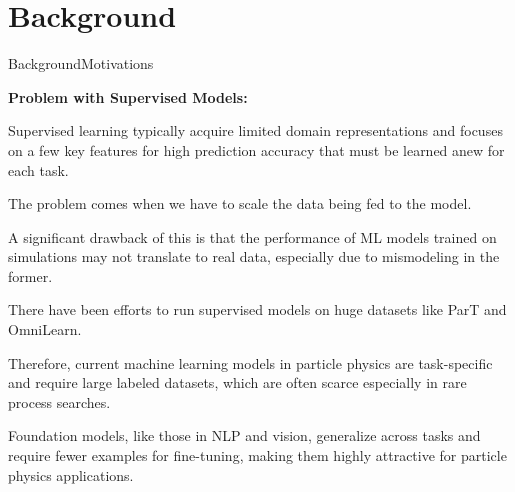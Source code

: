 \documentclass[10pt]{beamer}
\let\olditemize\itemize
\let\endolditemize\enditemize
\renewenvironment{itemize}{
  \olditemize[<+->] %
}{\endolditemize}
\begin{document}
\section{Background}
\begin{frame}{Background}{Motivations}

  \textbf{Problem with Supervised Models:}

  \begin{itemize}
    \item Supervised learning typically acquire limited domain representations and focuses on a few key features for
    high prediction accuracy that must be learned anew for each task.

    \item The problem comes when we have to scale the data being fed to the model.

  \item A significant drawback of this is that the performance of ML models trained on simulations
    may not translate to real data, especially due to mismodeling in the former.

    \item There have been efforts to run supervised models on huge datasets like ParT and
    OmniLearn.

  \end{itemize}

Therefore, current machine learning models in particle physics are task-specific and require large labeled datasets,
which are often scarce especially in rare process searches.

Foundation models, like those in NLP and vision, generalize across tasks and require fewer examples
for fine-tuning, making them highly attractive for particle physics applications.

\end{frame}
\end{document}
